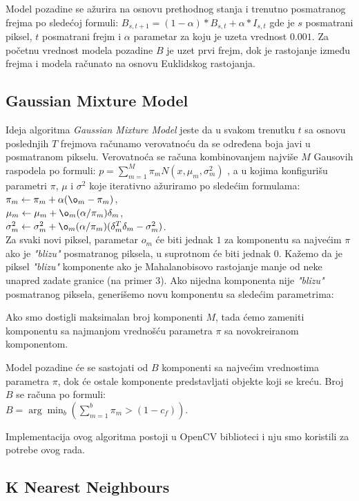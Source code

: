 \documentclass[a4paper]{article}
\begin{document}
Model pozadine se ažurira na osnovu prethodnog stanja i trenutno posmatranog frejma po sledećoj formuli: 
$B_{s,t+1} = (1 - \alpha) * B_{s,t} + \alpha * I_{s,t}$
gde je $s$ posmatrani piksel, $t$ posmatrani frejm i $\alpha$ parametar za koju je uzeta vrednost $0.001$. Za početnu vrednost modela pozadine $B$ je uzet prvi frejm, dok je rastojanje između frejma i modela računato na osnovu Euklidskog rastojanja.

\subsection{Gaussian Mixture Model}

Ideja algoritma \emph{Gaussian Mixture Model} jeste da u svakom trenutku $t$ sa osnovu poslednjih $T$ frejmova računamo verovatnoću da se određena boja javi u posmatranom pikselu. Verovatnoća se računa kombinovanjem najviše $M$ Gausovih raspodela po formuli: $p = \sum_{m = 1}^{M} \pi_m N (x, \mu_m, \sigma_m^2)$ , a u kojima konfigurišu parametri $\pi$, $\mu$ i $\sigma^2$ koje iterativno ažuriramo po sledećim formulama: \\
$\pi_m \leftarrow \pi_m + \alpha (\o_m - \pi_m)$,\\
$\mu_m \leftarrow \mu_m + \o_m (\alpha / \pi_m) \delta_m$,\\
$\sigma_m^2 \leftarrow \sigma_m^2 + \o_m (\alpha / \pi_m) (\delta_m^T \delta_m - \sigma_m^2)$.\\
Za svaki novi piksel, parametar $o_m$ će biti jednak $1$ za komponentu sa najvećim $\pi$ ako je \emph{"blizu"} posmatranog piksela, u suprotnom će biti jednak $0$. Kažemo da je piksel \emph{"blizu"} komponente ako je Mahalanobisovo rastojanje manje od neke unapred zadate granice (na primer $3$). Ako nijedna komponenta nije \emph{"blizu"} posmatranog piksela, generišemo novu komponentu sa sledećim parametrima: 

Ako smo dostigli maksimalan broj komponenti $M$, tada ćemo zameniti komponentu sa najmanjom vrednošću parametra $\pi$ sa novokreiranom komponentom.

Model pozadine će se sastojati od $B$ komponenti sa najvećim vrednostima parametra $\pi$, dok će ostale komponente predstavljati objekte koji se kreću. Broj $B$ se računa po formuli:\\
$B = \arg\min_{b} (\sum_{m = 1}^{b} \pi_m > (1 - c_f))$.

Implementacija ovog algoritma postoji u OpenCV biblioteci i nju smo koristili za potrebe ovog rada.

\subsection{K Nearest Neighbours}
\end{document}
